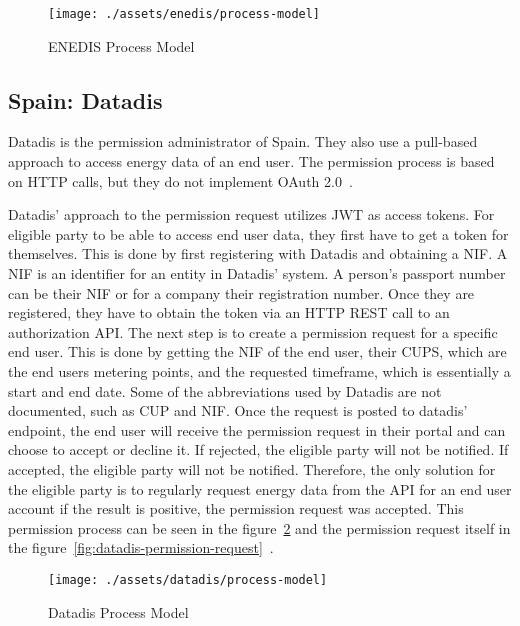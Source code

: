 \begin{figure}[h]
    \texttt{[image: ./assets/enedis/process-model]}
    \caption{ENEDIS Process Model}
    \label{fig:enedis-process-model}
\end{figure}

\subsection{Spain: Datadis}\label{subsec:spain:-datadis}
Datadis is the permission administrator of Spain.
They also use a pull-based approach to access energy data of an end user.
The permission process is based on HTTP calls, but they do not implement OAuth 2.0~\cite{datadis-dev-guide}.

Datadis' approach to the permission request utilizes JWT as access tokens.
For eligible party to be able to access end user data, they first have to get a token for themselves.
This is done by first registering with Datadis and obtaining a NIF.
A NIF is an identifier for an entity in Datadis' system.
A person's passport number can be their NIF or for a company their registration number.
Once they are registered, they have to obtain the token via an HTTP REST call to an authorization API.
The next step is to create a permission request for a specific end user.
This is done by getting the NIF of the end user, their CUPS, which are the end users metering points, and the requested timeframe, which is essentially a start and end date.
Some of the abbreviations used by Datadis are not documented, such as CUP and NIF.
Once the request is posted to datadis' endpoint, the end user will receive the permission request in their portal and can choose to accept or decline it.
If rejected, the eligible party will not be notified.
If accepted, the eligible party will not be notified.
Therefore, the only solution for the eligible party is to regularly request energy data from the API for an end user account if the result is positive, the permission request was accepted.
This permission process can be seen in the figure\ \ref{fig:datadis-process-model} and the permission request itself in the figure\ \ref{fig:datadis-permission-request}~\cite{datadis-dev-guide, bprt-issues}.

\begin{figure}[h]
    \texttt{[image: ./assets/datadis/process-model]}
    \caption{Datadis Process Model}
    \label{fig:datadis-process-model}
\end{figure}

